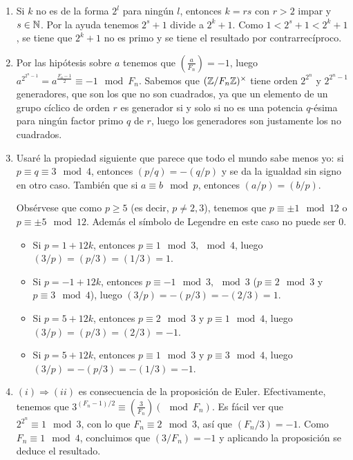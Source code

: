\documentclass[twoside]{article}
\begin{document}
\begin{solucion}
\begin{enumerate}
\item Si $k$ no es de la forma $2^l$ para ningún $l$, entonces $k=rs$ con $r>2$ impar y $s\in\mathbb{N}$. Por la ayuda tenemos $2^s+1$ divide a $2^k+1$. Como $1<2^s+1<2^k+1$, se tiene que $2^k+1$ no es primo y se tiene el resultado por contrarrecíproco. 




\item Por las hipótesis sobre $a$ tenemos que $\left(\frac{a}{F_n}\right)=-1$, luego $a^{2^{2^n-1}}=a^{\frac{F_n-1}{2}}\equiv -1\mod F_n$. Sabemos que $(\mathbb{Z}/F_n\mathbb{Z})^\times$ tiene orden $2^{2^n}$ y $2^{2^n-1}$ generadores, que son los que no son cuadrados, ya que un elemento de un grupo cíclico de orden $r$ es generador si y solo si no es una potencia $q$-ésima para ningún factor primo $q$ de $r$, luego los generadores son justamente los no cuadrados. 

\item Usaré la propiedad siguiente que parece que todo el mundo sabe menos yo: si $p\equiv q\equiv 3\mod 4$, entonces $(p/q)=-(q/p)$ y se da la igualdad sin signo en otro caso. También que si $a\equiv b\mod p$, entonces $(a/p)=(b/p)$. 

Obsérvese que como $p\geq 5$ (es decir, $p\neq 2,3$), tenemos que $p\equiv \pm 1\mod 12$ o $p\equiv \pm 5\mod 12$. Además el símbolo de Legendre en este caso no puede ser 0. 
\begin{itemize}
\item Si $p=1+12k$, entonces $p\equiv 1\mod 3,\mod 4$, luego $(3/p)=(p/3)=(1/3)=1$.
\item Si $p=-1+12k$, entonces $p\equiv -1\mod 3,\mod 3$ ($p\equiv 2\mod 3$ y $p\equiv 3\mod 4$), luego $(3/p)=-(p/3)=-(2/3)=1$.
\item Si $p=5+12k$, entonces $p\equiv 2\mod 3$ y $p\equiv 1\mod 4$, luego $(3/p)=(p/3)=(2/3)=-1$.
\item Si $p=5+12k$, entonces $p\equiv 1\mod 3$ y $p\equiv 3\mod 4$, luego $(3/p)=-(p/3)=-(1/3)=-1$. 
\end{itemize}

\item $(i)\Rightarrow (ii)$ es consecuencia de la proposición de Euler. Efectivamente, tenemos que $3^{(F_n−1)/2} ≡ \left(\frac{3}{F_n}\right) (\mod F_n)$. Es fácil ver que $2^{2^n}\equiv 1\mod 3$, con lo que $F_n\equiv 2\mod 3$, así que $(F_n/3)=-1$. Como $F_n\equiv 1\mod 4$, concluimos que $(3/F_n)=-1$ y aplicando la proposición se deduce el resultado. 



\end{enumerate}
\end{solucion}
\end{document}
